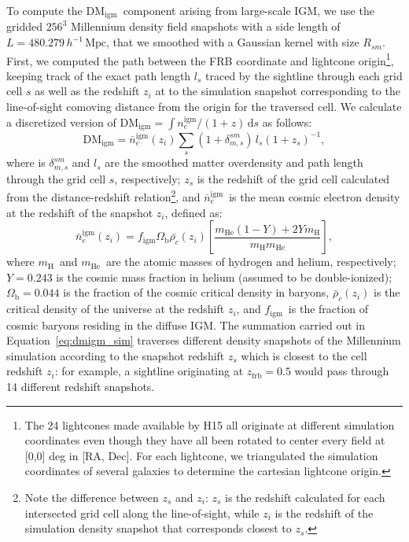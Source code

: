 \documentclass[twocolumn]{aastex63}
\newcommand{\dmigm}{\ensuremath{\mathrm{DM}_\mathrm{igm}}}
\newcommand{\figm}{\ensuremath{f_\mathrm{igm}}}
\newcommand{\zfrb}{\ensuremath{z_\mathrm{frb}}}
\newcommand{\hmpc}{\ensuremath{h^{-1}\,\mathrm{Mpc}}}
\newcommand{\mhe}{\ensuremath{m_\mathrm{He}}}
\newcommand{\mh}{\ensuremath{m_\mathrm{H}}}
\newcommand{\nbarigm}{\ensuremath{\bar{n}_e^\mathrm{igm}}}
\begin{document}
\begin{CJK*}{UTF8}{gbsn}
To compute the \dmigm\ component arising from large-scale IGM, we use the gridded $256^3$ Millennium density field snapshots with a side length of
$L=480.279\,\hmpc$, that we smoothed with a Gaussian kernel with size $R_{sm}$. First, we computed the path between the FRB coordinate and lightcone origin\footnote{The 24 lightcones made
available by H15 all originate at different simulation coordinates even though they have all been rotated to center every field at [0,0] deg in [RA, Dec]. 
For each lightcone, we triangulated the simulation coordinates of several galaxies to determine the cartesian lightcone origin.}, keeping track
of the exact path length $l_s$ traced by the sightline through each grid cell $s$ as well as the redshift $z_i$ at to the simulation snapshot corresponding
to the line-of-sight comoving distance from the origin for the traversed cell.
We calculate a discretized version of $\dmigm= \int n_e^{\mathrm{igm}}/(1+z)\,\mathrm{d}s$ as follows:
\begin{equation} \label{eq:dmigm_sim}
\dmigm   = \bar{n}_e^{\mathrm{igm}} (z_i) \sum\limits_{s}^{} (1+\delta^{sm}_{m,s} )\, l_s (1+z_s)^{-1},
\end{equation}
where is $\delta^{sm}_{m,s}$ and $l_s$ are the smoothed matter overdensity and path length through the grid cell $s$, respectively; $z_s$ is the redshift of the grid cell calculated
from the distance-redshift relation\footnote{Note the difference between $z_s$ and $z_i$: $z_s$ is the redshift calculated for each intersected
grid cell along the line-of-sight, while $z_i$ is the redshift of the simulation density snapshot that corresponds closest to $z_s$.}, and \nbarigm\ is the mean
cosmic electron density at the redshift of the snapshot $z_i$, defined as:
\begin{equation}\label{eq:ne_figm}
\nbarigm(z_i) = \figm \Omega_\mathrm{b} \bar{\rho_c}(z_i)\left[ \frac{\mhe(1-Y) + 2Y\mh}{\mh\mhe}\right],
\end{equation}
where \mh\ and \mhe\ are the atomic masses of 
hydrogen and helium, respectively; $Y=0.243$ is the cosmic mass fraction in helium
(assumed to be double-ionized);  $\Omega_\mathrm{b}=0.044$ is the fraction of the 
cosmic critical density in baryons, $\bar{\rho}_c(z_i)$ is the critical density of the universe at the redshift $z_i$, and \figm\ is the
fraction of cosmic baryons residing in the diffuse IGM. 
The summation carried out in Equation~\ref{eq:dmigm_sim} traverses different density snapshots of the Millennium simulation
 according to the snapshot redshift $z_s$ which is
closest to the cell redshift $z_i$: for example, a sightline originating at $\zfrb=0.5$ would pass through 14 different redshift snapshots.


\end{CJK*}
\end{document}
